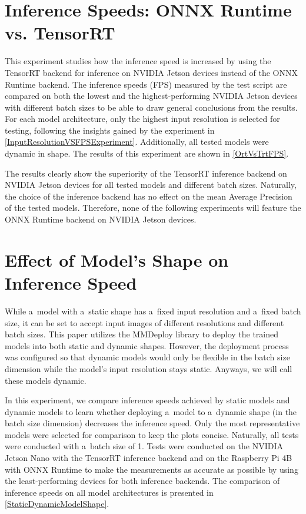 \section{Inference Speeds: ONNX Runtime vs. TensorRT}

This experiment studies how the inference speed is increased by using the
TensorRT backend for inference on NVIDIA Jetson devices instead of the ONNX
Runtime backend. The inference speeds (FPS) measured by the test script are
compared on both the lowest and the highest-performing NVIDIA Jetson devices
with different batch sizes to be able to draw general conclusions from the
results. For each model architecture, only the highest input resolution is
selected for testing, following the insights gained by the experiment in
\autoref{InputResolutionVSFPSExperiment}. Additionally, all tested models were
dynamic in shape. The results of this experiment are shown in
\autoref{OrtVsTrtFPS}.

The results clearly show the superiority of the TensorRT inference backend on
NVIDIA Jetson devices for all tested models and different batch sizes.
Naturally, the choice of the inference backend has no effect on the mean Average
Precision of the tested models. Therefore, none of the following experiments
will feature the ONNX Runtime backend on NVIDIA Jetson devices.


\section{Effect of Model's Shape on Inference Speed}

While a~model with a~static shape has a~fixed input resolution and a~fixed batch
size, it can be set to accept input images of different resolutions and
different batch sizes. This paper utilizes the MMDeploy library to deploy the
trained models into both static and dynamic shapes. However, the deployment
process was configured so that dynamic models would only be flexible in the
batch size dimension while the model's input resolution stays static. Anyways,
we will call these models dynamic.

In this experiment, we compare inference speeds achieved by static models and
dynamic models to learn whether deploying a~model to a~dynamic shape (in the
batch size dimension) decreases the inference speed. Only the most
representative models were selected for comparison to keep the plots concise.
Naturally, all tests were conducted with a~batch size of 1. Tests
were conducted on the NVIDIA Jetson Nano with the TensorRT inference backend and
on the Raspberry Pi 4B with ONNX Runtime to make the measurements as accurate as
possible by using the least-performing devices for both inference backends. The
comparison of inference speeds on all model architectures is presented in
\autoref{StaticDynamicModelShape}.

